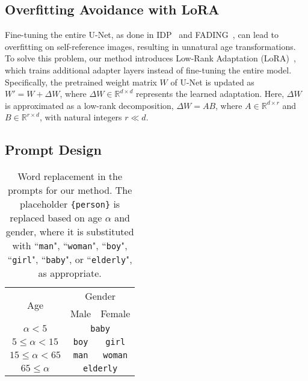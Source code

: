 \subsection{Overfitting Avoidance with LoRA
}
\label{sec:lora}
Fine-tuning the entire U-Net, as done in IDP~\cite{banerjee2023identity} and FADING~\cite{chen2023face}, can lead to overfitting on self-reference images, resulting in unnatural age transformations.
To solve this problem, our method introduces Low-Rank Adaptation (LoRA)~\cite{hu2021lora}, which trains additional adapter layers instead of fine-tuning the entire model. 
Specifically, the pretrained weight matrix $W$ of U-Net is updated as $W' = W + \Delta W$, where $\Delta W\in \mathbb{R}^{d\times d}$ represents the learned adaptation.
Here, $\Delta W$ is approximated as a low-rank decomposition, $\Delta W=AB$, where $A\in \mathbb{R}^{d\times r}$ and $B\in \mathbb{R}^{r\times d}$, with natural integers $r \ll d$.

\subsection{Prompt Design
}\label{sec:prompt_design}

\begin{table}[t]
  \centering
  \caption{
  Word replacement in the prompts for our method. The placeholder \texttt{\{person\}} is replaced based on age $\alpha$ and gender, where it is substituted with ``\texttt{man}", ``\texttt{woman}", ``\texttt{boy}", ``\texttt{girl}", ``\texttt{baby}", or ``\texttt{elderly}", as appropriate.
  }
  \label{tab:person}
  \begin{tabular}{ccc}
    \toprule
    \multirow{2}{*}{Age} & \multicolumn{2}{c}{Gender} \\
    \cmidrule(lr){2-3}
    & Male & Female \\
    \midrule
    $\alpha<5$ & \multicolumn{2}{c}{\texttt{baby}} \\
    $5\le\alpha<15$ & \texttt{boy} & \texttt{girl} \\
    $15\le\alpha<65$ & \texttt{man} & \texttt{woman} \\
    $65\le\alpha$ & \multicolumn{2}{c}{\texttt{elderly}} \\
    \bottomrule
  \end{tabular}
\end{table}

